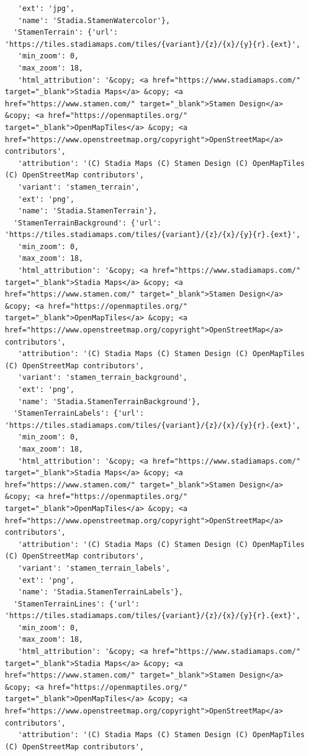 \documentclass[
  letterpaper,
  DIV=11,
  numbers=noendperiod]{scrreprt}
\begin{document}
\begin{verbatim}
   'ext': 'jpg',
   'name': 'Stadia.StamenWatercolor'},
  'StamenTerrain': {'url': 'https://tiles.stadiamaps.com/tiles/{variant}/{z}/{x}/{y}{r}.{ext}',
   'min_zoom': 0,
   'max_zoom': 18,
   'html_attribution': '&copy; <a href="https://www.stadiamaps.com/" target="_blank">Stadia Maps</a> &copy; <a href="https://www.stamen.com/" target="_blank">Stamen Design</a> &copy; <a href="https://openmaptiles.org/" target="_blank">OpenMapTiles</a> &copy; <a href="https://www.openstreetmap.org/copyright">OpenStreetMap</a> contributors',
   'attribution': '(C) Stadia Maps (C) Stamen Design (C) OpenMapTiles (C) OpenStreetMap contributors',
   'variant': 'stamen_terrain',
   'ext': 'png',
   'name': 'Stadia.StamenTerrain'},
  'StamenTerrainBackground': {'url': 'https://tiles.stadiamaps.com/tiles/{variant}/{z}/{x}/{y}{r}.{ext}',
   'min_zoom': 0,
   'max_zoom': 18,
   'html_attribution': '&copy; <a href="https://www.stadiamaps.com/" target="_blank">Stadia Maps</a> &copy; <a href="https://www.stamen.com/" target="_blank">Stamen Design</a> &copy; <a href="https://openmaptiles.org/" target="_blank">OpenMapTiles</a> &copy; <a href="https://www.openstreetmap.org/copyright">OpenStreetMap</a> contributors',
   'attribution': '(C) Stadia Maps (C) Stamen Design (C) OpenMapTiles (C) OpenStreetMap contributors',
   'variant': 'stamen_terrain_background',
   'ext': 'png',
   'name': 'Stadia.StamenTerrainBackground'},
  'StamenTerrainLabels': {'url': 'https://tiles.stadiamaps.com/tiles/{variant}/{z}/{x}/{y}{r}.{ext}',
   'min_zoom': 0,
   'max_zoom': 18,
   'html_attribution': '&copy; <a href="https://www.stadiamaps.com/" target="_blank">Stadia Maps</a> &copy; <a href="https://www.stamen.com/" target="_blank">Stamen Design</a> &copy; <a href="https://openmaptiles.org/" target="_blank">OpenMapTiles</a> &copy; <a href="https://www.openstreetmap.org/copyright">OpenStreetMap</a> contributors',
   'attribution': '(C) Stadia Maps (C) Stamen Design (C) OpenMapTiles (C) OpenStreetMap contributors',
   'variant': 'stamen_terrain_labels',
   'ext': 'png',
   'name': 'Stadia.StamenTerrainLabels'},
  'StamenTerrainLines': {'url': 'https://tiles.stadiamaps.com/tiles/{variant}/{z}/{x}/{y}{r}.{ext}',
   'min_zoom': 0,
   'max_zoom': 18,
   'html_attribution': '&copy; <a href="https://www.stadiamaps.com/" target="_blank">Stadia Maps</a> &copy; <a href="https://www.stamen.com/" target="_blank">Stamen Design</a> &copy; <a href="https://openmaptiles.org/" target="_blank">OpenMapTiles</a> &copy; <a href="https://www.openstreetmap.org/copyright">OpenStreetMap</a> contributors',
   'attribution': '(C) Stadia Maps (C) Stamen Design (C) OpenMapTiles (C) OpenStreetMap contributors',

\end{verbatim}
\end{document}
